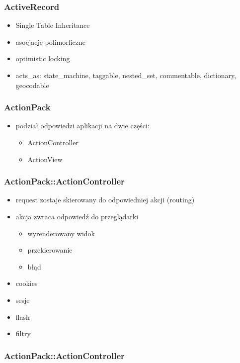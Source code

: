 \documentclass[12t]{beamer}
\begin{document}
\begin{frame}
  \frametitle{ActiveRecord}
  \begin{itemize}
  \item Single Table Inheritance
  \item asocjacje polimorficzne
  \item optimistic locking
  \item acts\_as: state\_machine, taggable, nested\_set, commentable,
    dictionary, geocodable
  \end{itemize}
\end{frame}

\begin{frame}
  \frametitle{ActionPack}
  \begin{itemize}
  \item podział odpowiedzi aplikacji na dwie części:
    \begin{itemize}
    \item ActionController
    \item ActionView
    \end{itemize}
  \end{itemize}
\end{frame}

\begin{frame}
  \frametitle{ActionPack::ActionController}
  \begin{itemize}
  \item request zostaje skierowany do odpowiedniej akcji (routing)
  \item akcja zwraca odpowiedź do przeglądarki
    \begin{itemize}
    \item wyrenderowany widok
    \item przekierowanie
    \item błąd
    \end{itemize}
  \item cookies
  \item sesje
  \item flash
  \item filtry
  \end{itemize}
\end{frame}

\begin{frame}
  \frametitle{ActionPack::ActionController}
  \begin{small}
  
  \end{small}
\end{frame}
\end{document}
